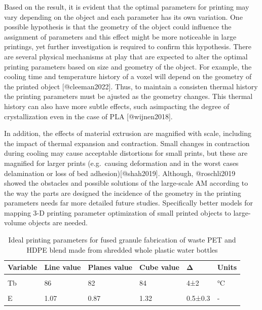 \documentclass[
  letterpaper,
  DIV=11,
  numbers=noendperiod]{scrartcl}
\begin{document}
Based on the result, it is evident that the optimal parameters for
printing may vary depending on the object and each parameter has its own
variation. One possible hypothesis is that the geometry of the object
could influence the assignment of parameters and this effect might be
more noticeable in large printings, yet further investigation is
required to confirm this hypothesis. There are several physical
mechanisms at play that are expected to alter the optimal printing
parameters based on size and geometry of the object. For example, the
cooling time and temperature history of a voxel will depend on the
geometry of the printed object {[}@cleeman2022{]}. Thus, to maintain a
consisten thermal history the printing parameters must be ajusted as the
geometry changes. This thermal history can also have more subtle
effects, such asimpacting the degree of crystallization even in the case
of PLA {[}@wijnen2018{]}.

In addition, the effects of material extrusion are magnified with scale,
including the impact of thermal expansion and contraction. Small changes
in contraction during cooling may cause acceptable distortions for small
prints, but these are magnified for larger prints (e.g.~causing
deformation and in the worst cases delamination or loss of bed
adhesion){[}@shah2019{]}. Although, @roschli2019 showed the obstacles
and possible solutions of the large-scale AM according to the way the
parts are designed the incidence of the geometry in the printing
parameters needs far more detailed future studies. Specifically better
models for mapping 3-D printing parameter optimization of small printed
objects to large-volume objects are needed.

\hypertarget{tbl-table3}{}
\begin{table}
\caption{\label{tbl-table3}Ideal printing parameters for fused granule fabrication of waste PET and
HDPE blend made from shredded whole plastic water bottles }\tabularnewline

\centering\begingroup\fontsize{10}{12}\selectfont

\begin{tabular}[t]{llllll}
\toprule
Variable & Line value & Planes value & Cube value & Δ & Units\\
\midrule
\cellcolor{gray!6}{T1} & \cellcolor{gray!6}{258} & \cellcolor{gray!6}{263} & \cellcolor{gray!6}{264} & \cellcolor{gray!6}{6 ±3.2} & \cellcolor{gray!6}{°C}\\
Tb & 86 & 82 & 84 & 4±2 & °C\\
\cellcolor{gray!6}{Ps} & \cellcolor{gray!6}{21} & \cellcolor{gray!6}{14} & \cellcolor{gray!6}{10} & \cellcolor{gray!6}{11±5.6} & \cellcolor{gray!6}{mm/s}\\
E & 1.07 & 0.87 & 1.32 & 0.5±0.3 & -\\
\bottomrule
\end{tabular}
\endgroup{}
\end{table}
\end{document}
